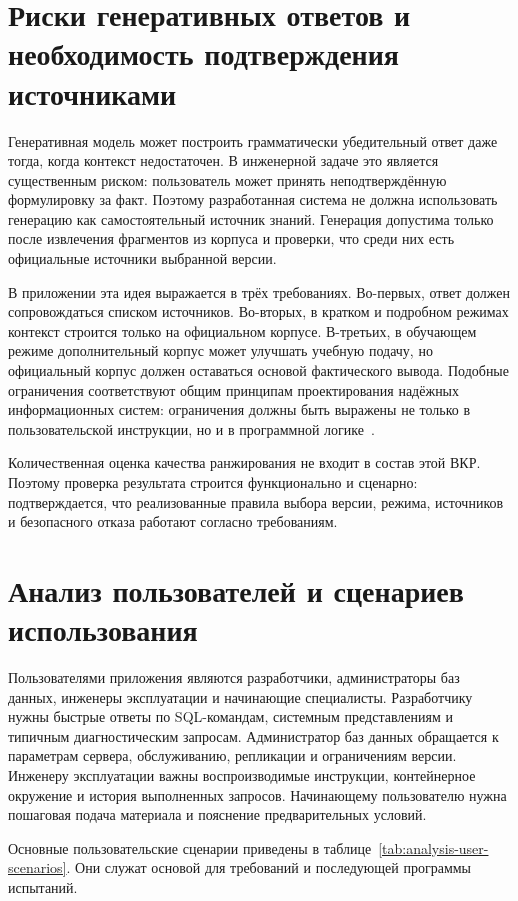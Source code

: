 \section{Риски генеративных ответов и необходимость подтверждения источниками}

Генеративная модель может построить грамматически убедительный ответ даже тогда, когда контекст недостаточен. В инженерной задаче это является существенным риском: пользователь может принять неподтверждённую формулировку за факт. Поэтому разработанная система не должна использовать генерацию как самостоятельный источник знаний. Генерация допустима только после извлечения фрагментов из корпуса и проверки, что среди них есть официальные источники выбранной версии.

В приложении эта идея выражается в трёх требованиях. Во-первых, ответ должен сопровождаться списком источников. Во-вторых, в кратком и подробном режимах контекст строится только на официальном корпусе. В-третьих, в обучающем режиме дополнительный корпус может улучшать учебную подачу, но официальный корпус должен оставаться основой фактического вывода. Подобные ограничения соответствуют общим принципам проектирования надёжных информационных систем: ограничения должны быть выражены не только в пользовательской инструкции, но и в программной логике~\cite{martin2017,fowler2002,bass2021}.

Количественная оценка качества ранжирования не входит в состав этой ВКР. Поэтому проверка результата строится функционально и сценарно: подтверждается, что реализованные правила выбора версии, режима, источников и безопасного отказа работают согласно требованиям.

\section{Анализ пользователей и сценариев использования}

Пользователями приложения являются разработчики, администраторы баз данных, инженеры эксплуатации и начинающие специалисты. Разработчику нужны быстрые ответы по SQL-командам, системным представлениям и типичным диагностическим запросам. Администратор баз данных обращается к параметрам сервера, обслуживанию, репликации и ограничениям версии. Инженеру эксплуатации важны воспроизводимые инструкции, контейнерное окружение и история выполненных запросов. Начинающему пользователю нужна пошаговая подача материала и пояснение предварительных условий.

Основные пользовательские сценарии приведены в таблице~\ref{tab:analysis-user-scenarios}. Они служат основой для требований и последующей программы испытаний.

